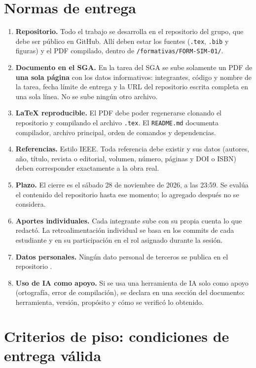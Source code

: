 \documentclass[11pt]{article}
\newcommand{\seccion}[1]{\section{\textcolor{utegreendk}{#1}}}
\begin{document}
\seccion{Normas de entrega}

\begin{enumerate}[leftmargin=20pt,itemsep=3pt]
	\item \textbf{Repositorio.} Todo el trabajo se desarrolla en el repositorio del grupo, que debe ser público en GitHub. Allí deben estar los fuentes (\texttt{.tex}, \texttt{.bib} y figuras) y el PDF compilado, dentro de \texttt{/formativas/FORM-SIM-01/}.
	\item \textbf{Documento en el SGA.} En la tarea del SGA se sube solamente un PDF de \textbf{una sola página} con los datos informativos: integrantes, código y nombre de la tarea, fecha límite de entrega y la URL del repositorio escrita completa en una sola línea. No se sube ningún otro archivo.
	\item \textbf{\LaTeX{} reproducible.} El PDF debe poder regenerarse clonando el repositorio y compilando el archivo \texttt{.tex}. El \texttt{README.md} documenta compilador, archivo principal, orden de comandos y dependencias.
	\item \textbf{Referencias.} Estilo IEEE. Toda referencia debe existir y sus datos (autores, año, título, revista o editorial, volumen, número, páginas y DOI o ISBN) deben corresponder exactamente a la obra real.
	\item \textbf{Plazo.} El cierre es el sábado 28 de noviembre de 2026, a las 23:59. Se evalúa el contenido del repositorio hasta ese momento; lo agregado después no se considera.
	\item \textbf{Aportes individuales.} Cada integrante sube con su propia cuenta lo que redactó. La retroalimentación individual se basa en los commits de cada estudiante y en su participación en el rol asignado durante la sesión.
	\item \textbf{Datos personales.} Ningún dato personal de terceros se publica en el repositorio \citep{lopdp_2021}.
	\item \textbf{Uso de IA como apoyo.} Si se usa una herramienta de IA solo como apoyo (ortografía, error de compilación), se declara en una sección del documento: herramienta, versión, propósito y cómo se verificó lo obtenido.
\end{enumerate}

\seccion{Criterios de piso: condiciones de entrega válida}
\end{document}
